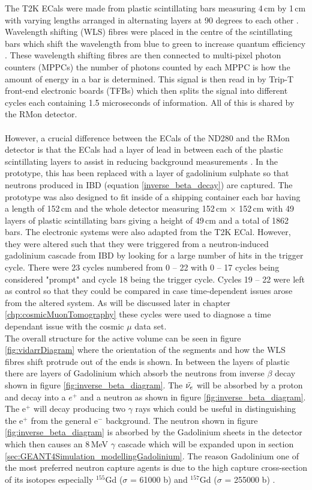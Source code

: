The T2K ECals were made from plastic scintillating bars measuring 4\,cm by 1\,cm with varying lengths arranged in alternating layers at 90 degrees to each other \cite{Allan_2013}. Wavelength shifting (WLS) fibres were placed in the centre of the scintillating bars which shift the wavelength from blue to green to increase quantum efficiency \cite{Allan_2013}. These wavelength shifting fibres are then connected to multi-pixel photon counters (MPPCs) the number of photons counted by each MPPC is how the amount of energy in a bar is determined. This signal is then read in by Trip-T front-end electronic boards (TFBs) which then splits the signal into different cycles each containing 1.5 microseconds of information. All of this is shared by the RMon detector. 
\\\\However, a crucial difference between the ECals of the ND280 and the RMon detector is that the ECals had a layer of lead in between each of the plastic scintillating layers to assist in reducing background measurements \cite{Allan_2013}. In the prototype, this has been replaced with a layer of gadolinium sulphate so that neutrons produced in IBD (equation \ref{inverse_beta_decay}) are captured. The prototype was also designed to fit inside of a shipping container each bar having a length of 152\,cm and the whole detector measuring 152\,cm $\times$ 152\,cm with 49 layers of plastic scintillating bars giving a height of 49\,cm and a total of 1862 bars. The electronic systems were also adapted from the T2K ECal. However, they were altered such that they were triggered from a neutron-induced gadolinium cascade from IBD by looking for a large number of hits in the trigger cycle. There were 23 cycles numbered from 0 -- 22 with 0 -- 17 cycles being considered "prompt" and cycle 18 being the trigger cycle. Cycles 19 -- 22 were left as control so that they could be compared in case time-dependent issues arose from the altered system. As will be discussed later in chapter \ref{chp:cosmicMuonTomography} these cycles were used to diagnose a time dependant issue with the cosmic $\mu$ data set.
\\The overall structure for the active volume can be seen in figure \ref{fig:vidarrDiagram} where the orientation of the segments and how the WLS fibres shift protrude out of the ends is shown. In between the layers of plastic there are layers of Gadolinium which absorb the neutrons from inverse $\beta$ decay shown in figure \ref{fig:inverse_beta_diagram}. The $\Bar{\nu_e}$ will be absorbed by a proton and decay into a $e^+$ and a neutron as shown in figure \ref{fig:inverse_beta_diagram}. The e$^+$ will decay producing two $\gamma$ rays which could be useful in distinguishing the e$^+$ from the general e$^-$ background. The neutron shown in figure \ref{fig:inverse_beta_diagram} is absorbed by the Gadolinium sheets in the detector which then causes an 8\,MeV $\gamma$ cascade which will be expanded upon in section \ref{sec:GEANT4Simulation_modellingGadolinium}. The reason Gadolinium one of the most preferred neutron capture agents is due to the high capture cross-section of its isotopes especially $^{155}$Gd ($\sigma$ = 61000 b) and $^{157}$Gd ($\sigma$ = 255000 b) \cite{gadFoilsThermalNeut}. 

